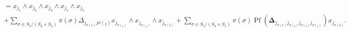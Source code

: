 \documentclass[aps, preprint]{revtex4}
\begin{document}
\begin{align} &  =x_{j_{1}} \wedge x_{j_{2}} \wedge x_{j_{3}} \wedge x_{j_{4}} \wedge x_{j_{5}} \nonumber  \\
 &  +\sum _{\sigma  \in S_{5}/\left (S_{2} \times S_{3}\right )}\pi  \left (\sigma \right )  \Delta _{j_{\sigma  \left (1\right )} j \sigma  \left (_{2}\right )}x_{j_{\sigma  \left (_{3}\right )}} \wedge x_{j_{\sigma  \left (_{4}\right )}} \wedge x_{j_{\sigma  \left (5\right )}} +\sum _{\sigma  \in S_{5}/\left (S_{4} \times S_{1}\right )}\pi  \left (\sigma \right ) \ensuremath{\operatorname*{Pf}} \left (\mathbf{\Delta }_{j_{\sigma  \left (1\right )} j_{\sigma  \left (_{2}\right )} j_{\sigma  \left (_{3}\right )} j_{\sigma  \left (_{4}\right )}}\right ) x_{j_{\sigma  \left (5\right )}}\text{.}\end{align}
\end{document}
